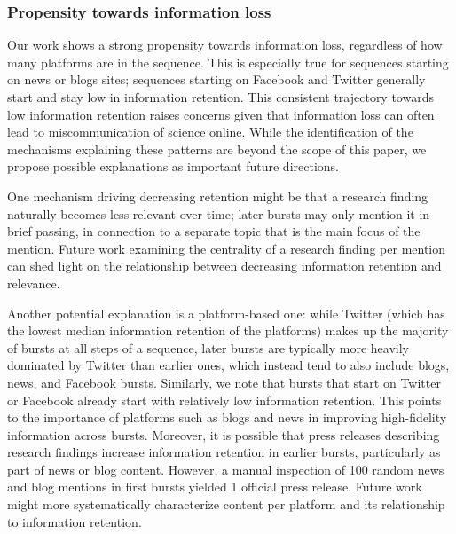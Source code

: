 \documentclass[letterpaper]{article} %
\begin{document}
\subsubsection{Propensity towards information loss}
Our work shows a strong propensity towards information loss, regardless of how many platforms are in the sequence. This is especially true for sequences starting on news or blogs sites; sequences starting on Facebook and Twitter generally start and stay low in information retention. This consistent trajectory towards low information retention raises concerns given that information loss can often lead to miscommunication of science online. While the identification of the mechanisms explaining these patterns are beyond the scope of this paper, we propose possible explanations as important future directions.

One mechanism driving decreasing retention might be that a research finding naturally becomes less relevant over time; later bursts may only mention it in brief passing, in connection to a separate topic that is the main focus of the mention. Future work examining the centrality of a research finding per mention can shed light on the relationship between decreasing information retention and relevance.

Another potential explanation is a platform-based one: while Twitter (which has the lowest median information retention of the platforms) makes up the majority of bursts at all steps of a sequence, later bursts are typically more heavily dominated by Twitter than earlier ones, which instead tend to also include blogs, news, and Facebook bursts. Similarly, we note that bursts that start on Twitter or Facebook already start with relatively low information retention. This points to the importance of platforms such as blogs and news in improving high-fidelity information across bursts. Moreover, it is possible that press releases describing research findings increase information retention in earlier bursts, particularly as part of news or blog content. However, a manual inspection of %
100 random news and blog mentions in first bursts yielded 1 official press release. Future work might more systematically characterize content per platform and its relationship to information retention.
\end{document}

